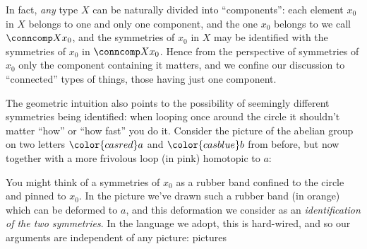 In fact, \emph{any} type $X$ can be naturally divided into ``components'': each
element $x_0$ in $X$ belongs to one and only one component, and the one $x_0$
belongs to we call $\conncomp X {x_0}$, and the symmetries of $x_0$ in $X$ may
be identified with the symmetries of $x_0$ in $\conncomp X {x_0}$. Hence from
the perspective of symmetries of $x_0$ only the component containing it matters,
and we confine our discussion to ``connected'' types of things, \ie those having
just one component.

The geometric intuition also points to the possibility of seemingly different symmetries being identified: when looping once around the circle it shouldn't matter ``how'' or ``how fast'' you do it. Consider the picture of the abelian group on two letters ${\color{casred}a}$ and ${\color{casblue}b}$ from before, but now together with a more frivolous loop (in pink) homotopic to $a$:
\begin{center}
\end{center}
You might think of a symmetries of $x_0$ as a rubber band confined to the circle
and pinned to $x_0$. In the picture we've drawn such a rubber band (in orange)
which can be deformed to $a$, and this deformation we consider as
an \emph{identification of the two symmetries}.  In the language we adopt, this
is hard-wired, and so our arguments are independent of any picture: pictures

